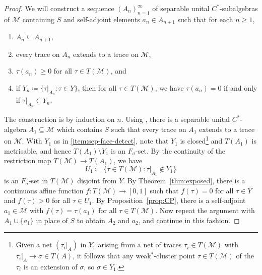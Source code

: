 \documentclass[a4paper,11pt]{amsart}
\theoremstyle{definition}
\numberwithin{equation}{section}
\numberwithin{theorem}{section}
\newcommand{\M}{\mathcal{M}}
\begin{document}
\begin{proof}
	We will construct a sequence $(A_n)_{n=1}^\infty$ of separable unital $C^*$-sub\-algebras of $\M$ containing $S$ and self-adjoint elements $a_n \in A_{n+1}$ such that for each $n \geq 1$,
	\begin{enumerate}
		\item\label{item:sep-face-increase} $A_n \subseteq A_{n+1}$,
		\item\label{item:sep-face-extend} every trace on $A_n$ extends to a trace on $\M$,
		\item\label{item:sep-face-positive} $\tau(a_n) \geq 0$ for all $\tau \in T(\M)$, and
		\item\label{item:sep-face-detect} if $Y_n \coloneqq \{\tau|_{A_n} : \tau \in Y \}$, then for all $\tau \in T(\M)$, we have $\tau(a_n) = 0$ if and only if $\tau|_{A_n} \in Y_n$.
	\end{enumerate}
	
	The construction is by induction on $n$.  Using \cite[Lemma~9]{Oz13}, there is a separable unital $C^*$-algebra $A_1 \subseteq \M$ which contains $S$ such that every trace on $A_1$ extends to a trace on $\M$.  With $Y_1$ as in \ref{item:sep-face-detect}, note that $Y_1$ is closed\footnote{Given a net $(\tau_i|_A)$ in $Y_1$ arising from a net of traces $\tau_i\in T(\M)$ with $\tau_i|_A\to\sigma\in T(A)$, it follows that any weak$^*$-cluster point $\tau\in T(\M)$ of the $\tau_i$ is an extension of $\sigma$, so $\sigma\in Y_1$.\label{foot:closed}} and $T(A_1)$ is metrisable, and hence $T(A_1) \setminus Y_1$ is an $F_\sigma$-set.  By the continuity of the restriction map $T(\M) \rightarrow T(A_1)$, we have
	\begin{equation}
		U_1 \coloneqq \{ \tau \in T(\M) : \tau|_{A_1} \notin Y_1 \}
	\end{equation}
	is an $F_\sigma$-set in $T(\M)$ disjoint from $Y$.  By Theorem~\ref{thm:exposed}, there is a continuous affine function $f \colon T(\M) \rightarrow [0, 1]$ such that $f(\tau) = 0$ for all $\tau \in Y$ and $f(\tau) > 0$ for all $\tau \in U_1$.  By Proposition~\ref{prop:CP}, there is a self-adjoint $a_1 \in \M$ with $f(\tau) = \tau(a_1)$ for all $\tau \in T(\M)$.  Now repeat the argument with $A_1 \cup \{a_1\}$ in place of $S$ to obtain $A_2$ and $a_2$, and continue in this fashion.
	

\end{proof}
\end{document}
